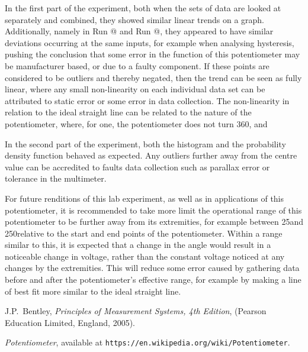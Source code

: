 \documentclass[a4,11pt]{article}
\makeatletter
\newcommand*{\rom}[1]{\expandafter\@slowromancap\romannumeral #1@}
\makeatother
\begin{document}
 In the first part of the experiment, both when the sets of data are looked at separately and combined, they showed similar linear trends on a graph. Additionally, namely in Run \rom{1} and Run \rom{2}, they appeared to have similar deviations occurring at the same inputs, for example when analysing hysteresis, pushing the conclusion that some error in the function of this potentiometer may be manufacturer based, or due to a faulty component. If these points are considered to be outliers and thereby negated, then the trend can be seen as fully linear, where any small non-linearity on each individual data set can be attributed to static error or some error in data collection. The non-linearity in relation to the ideal straight line can be related to the nature of the potentiometer, where, for one, the potentiometer does not turn 360\degree, and 
 
 In the second part of the experiment, both the histogram and the probability density function behaved as expected. Any outliers further away from the centre value can be accredited to faults data collection such as parallax error or tolerance in the multimeter.

For future renditions of this lab experiment, as well as in applications of this potentiometer, it is recommended to take more limit the operational range of this potentiometer to be further away from its extremities, for example between 25\degree and 250\degree relative to the start and end points of the potentiometer. Within a range similar to this, it is expected that a change in the angle would result in a noticeable change in voltage, rather than the constant voltage noticed at any changes by the extremities. This will reduce some error caused by gathering data before and after the potentiometer's effective range, for example by making a line of best fit more similar to the ideal straight line.
\onecolumn
\begin{thebibliography}{99}
	
	J.P.\ Bentley, \textit{Principles of Measurement Systems, 4th Edition},
	(Pearson Education Limited, England, 2005).
	
	 \emph{Potentiometer},   available at
	\texttt{https://en.wikipedia.org/wiki/Potentiometer}.
	
\end{thebibliography}
\appendix
\end{document}
